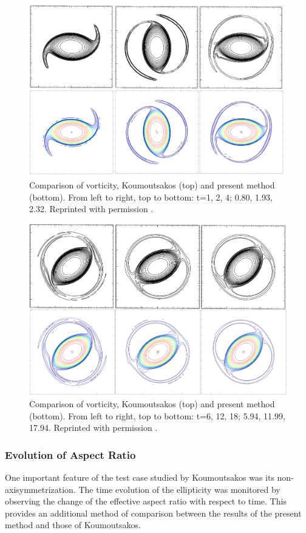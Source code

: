 \documentclass[]{aiaa-tc}%
\begin{document}
\begin{figure}[t]
\centering
\includegraphics[width=1\textwidth]{KoumComp1R.PNG}
\caption{\label{fig:KoumComp1}Comparison of vorticity, Koumoutsakos \cite{Koum1997} (top) and present method (bottom). From left to right, top to bottom: t=1, 2, 4; 0.80, 1.93, 2.32. Reprinted with permission \cite{KoumLic}.}
\end{figure}
\begin{figure}[t]
\centering
\includegraphics[width=1\textwidth]{KoumComp2R.PNG}
\caption{\label{fig:KoumComp2}Comparison of vorticity, Koumoutsakos \cite{Koum1997} (top) and present method (bottom). From left to right, top to bottom: t=6, 12, 18; 5.94, 11.99, 17.94. Reprinted with permission \cite{KoumLic}.}
\end{figure}

%
\subsubsection{Evolution of Aspect Ratio}
One important feature of the test case studied by Koumoutsakos \cite{Koum1997} was its non-axisymmetrization. The time evolution of the ellipticity was monitored by observing the change of the effective aspect ratio with respect to time. This provides an additional method of comparison between the results of the present method and  those of Koumoutsakos.
\end{document}
